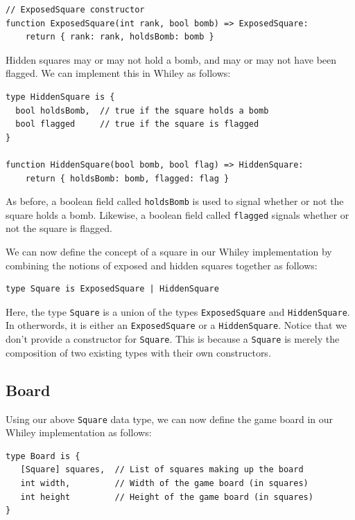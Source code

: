 \begin{lstlisting}
// ExposedSquare constructor
function ExposedSquare(int rank, bool bomb) => ExposedSquare:
    return { rank: rank, holdsBomb: bomb }
\end{lstlisting}


Hidden squares may or may not hold a bomb, and may or may not have been flagged.  We can implement this in Whiley as follows:

\begin{lstlisting}
type HiddenSquare is { 
  bool holdsBomb,  // true if the square holds a bomb
  bool flagged     // true if the square is flagged
}

function HiddenSquare(bool bomb, bool flag) => HiddenSquare:
    return { holdsBomb: bomb, flagged: flag }
\end{lstlisting}

As before, a boolean field called \lstinline{holdsBomb} is used to signal whether or not the square holds a bomb.  Likewise, a boolean field called \lstinline{flagged} signals whether or not the square is flagged.  

We can now define the concept of a square in our Whiley implementation by combining the notions of exposed and hidden squares together as follows:

\begin{lstlisting}
type Square is ExposedSquare | HiddenSquare
\end{lstlisting}

Here, the type \lstinline{Square} is a union of the types \lstinline{ExposedSquare} and \lstinline{HiddenSquare}.  In otherwords, it is either an \lstinline{ExposedSquare} or a \lstinline{HiddenSquare}.  Notice that we don't provide a constructor for \lstinline{Square}.  This is because a \lstinline{Square} is merely the composition of two existing types with their own constructors.

\subsection{Board}

Using our above \lstinline{Square} data type, we can now define the game board in our Whiley implementation as follows:

\begin{lstlisting}
type Board is {
   [Square] squares,  // List of squares making up the board
   int width,         // Width of the game board (in squares)
   int height         // Height of the game board (in squares)
}
\end{lstlisting}

